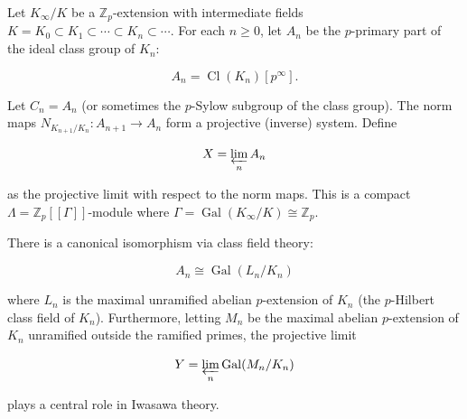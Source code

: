 Let $K_\infty / K$ be a $\mathbb{Z}_p$-extension with intermediate fields $K = K_0 \subset K_1 \subset \cdots \subset K_n \subset \cdots$. For each $n \geq 0$, let $A_n$ be the $p$-primary part of the ideal class group of $K_n$:

$$
A_n = \operatorname{Cl}(K_n)[p^\infty].
$$

Let $C_n = A_n$ (or sometimes the $p$-Sylow subgroup of the class group). The norm maps $N_{K_{n+1}/K_n} : A_{n+1} \to A_n$ form a projective (inverse) system. Define

$$
X = \varprojlim_n A_n
$$

as the projective limit with respect to the norm maps. This is a compact $\Lambda = \mathbb{Z}_p[[\Gamma]]$-module where $\Gamma = \operatorname{Gal}(K_\infty/K) \cong \mathbb{Z}_p$.

There is a canonical isomorphism via class field theory:

$$
A_n \cong \operatorname{Gal}(L_n / K_n)
$$

where $L_n$ is the maximal unramified abelian $p$-extension of $K_n$ (the $p$-Hilbert class field of $K_n$). Furthermore, letting $M_n$ be the maximal abelian $p$-extension of $K_n$ unramified outside the ramified primes, the projective limit

$$
Y = \varprojlim_n \operatorname{Gal}(M_n / K_n)
$$

plays a central role in Iwasawa theory.
